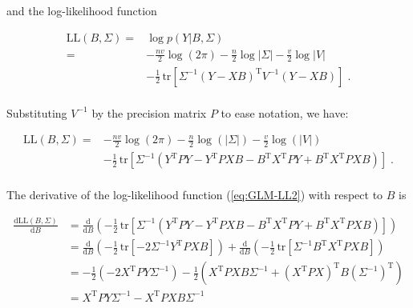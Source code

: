 and the log-likelihood function

\vspace{-0.5em}
\begin{equation} \label{eq:GLM-LL1}
\begin{split}
\mathrm{LL}(B,\Sigma) = &\log p(Y|B,\Sigma) \\
= &- \frac{nv}{2} \log(2\pi) - \frac{n}{2} \log |\Sigma| - \frac{v}{2} \log |V| \\
&- \frac{1}{2} \, \mathrm{tr}\left[ \Sigma^{-1} (Y - XB)^\mathrm{T} V^{-1} (Y - XB) \right] \; .\\
\end{split}
\end{equation}

Substituting $V^{-1}$ by the precision matrix $P$ to ease notation, we have:

\vspace{-0.5em}
\begin{equation} \label{eq:GLM-LL2}
\begin{split}
\mathrm{LL}(B,\Sigma) = &- \frac{nv}{2} \log(2\pi) - \frac{n}{2} \log(|\Sigma|) - \frac{v}{2} \log(|V|) \\
&- \frac{1}{2} \, \mathrm{tr}\left[ \Sigma^{-1} \left( Y^\mathrm{T} P Y - Y^\mathrm{T} P X B - B^\mathrm{T} X^\mathrm{T} P Y + B^\mathrm{T} X^\mathrm{T} P X B \right) \right] \; .\\
\end{split}
\end{equation}

The derivative of the log-likelihood function (\ref{eq:GLM-LL2}) with respect to $B$ is

\vspace{-0.5em}
\begin{equation} \label{eq:dLL-dB}
\begin{split}
\frac{\mathrm{d}\mathrm{LL}(B,\Sigma)}{\mathrm{d}B} &= \frac{\mathrm{d}}{\mathrm{d}B} \left( - \frac{1}{2} \, \mathrm{tr}\left[ \Sigma^{-1} \left( Y^\mathrm{T} P Y - Y^\mathrm{T} P X B - B^\mathrm{T} X^\mathrm{T} P Y + B^\mathrm{T} X^\mathrm{T} P X B \right) \right] \right) \\
&= \frac{\mathrm{d}}{\mathrm{d}B} \left( -\frac{1}{2} \, \mathrm{tr}\left[ -2 \Sigma^{-1} Y^\mathrm{T} P X B \right] \right) + \frac{\mathrm{d}}{\mathrm{d}B} \left( -\frac{1}{2} \, \mathrm{tr}\left[ \Sigma^{-1} B^\mathrm{T} X^\mathrm{T} P X B \right] \right) \\
&= - \frac{1}{2} \left( -2 X^\mathrm{T} P Y \Sigma^{-1} \right) - \frac{1}{2} \left( X^\mathrm{T} P X B \Sigma^{-1} + (X^\mathrm{T} P X)^\mathrm{T} B (\Sigma^{-1})^\mathrm{T} \right) \\
&= X^\mathrm{T} P Y \Sigma^{-1} - X^\mathrm{T} P X B \Sigma^{-1} \\
\end{split}
\end{equation}

